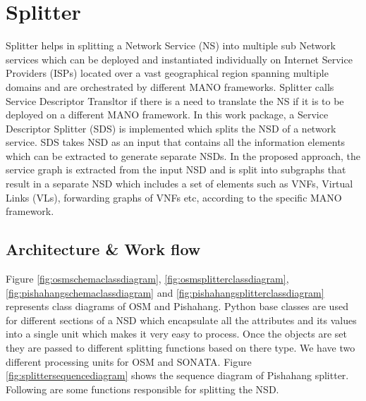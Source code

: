 \section{Splitter}
Splitter helps in splitting a Network Service (NS) into multiple sub Network services which can be deployed and instantiated individually on Internet Service Providers (ISPs) located over a vast geographical region spanning multiple domains and are orchestrated by different MANO frameworks. Splitter calls Service Descriptor Transltor if there is a need to translate the NS if it is to be deployed on a different MANO framework. In this work package, a Service Descriptor Splitter (SDS) is implemented which splits the NSD of a network service. SDS takes NSD as an input that contains all the information elements which can be extracted to generate separate NSDs. In the proposed approach, the service graph is extracted from the input NSD and is split into subgraphs that result in a separate NSD which includes a set of elements such as VNFs, Virtual Links (VLs), forwarding graphs of VNFs etc, according to the specific MANO framework.

\subsection{Architecture & Work flow}

Figure \ref{fig:osmschemaclassdiagram}, \ref{fig:osmsplitterclassdiagram}, \ref{fig:pishahangschemaclassdiagram} and \ref{fig:pishahangsplitterclassdiagram} represents class diagrams of OSM and Pishahang. Python base classes are used for different sections of a NSD which encapsulate all the attributes and its values into a single unit which makes it very easy to process. Once the objects are set they are passed to different splitting functions based on there type. We have two different processing units for OSM and SONATA. Figure \ref{fig:splittersequencediagram} shows the sequence diagram of Pishahang splitter. Following are some functions responsible for splitting the NSD.

